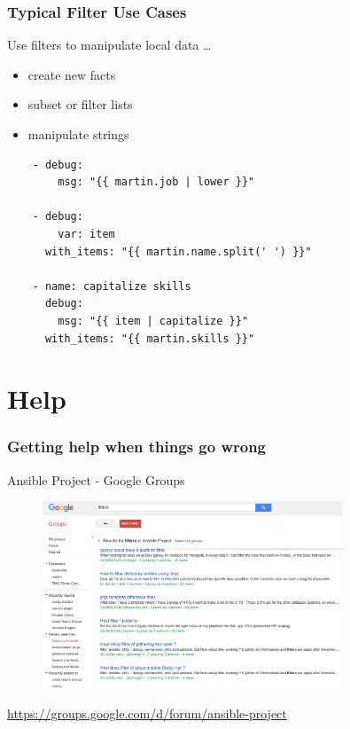 \documentclass[pdf]{beamer}
\begin{document}
\begin{frame}[t,fragile]
  \frametitle{Typical Filter Use Cases}
  Use filters to manipulate local data \ldots
  \begin{itemize}
    \item {create new facts}
    \item {subset or filter lists}
    \item \alert {manipulate strings}
  \end{itemize}
  \begin{lstlisting}
    - debug:
        msg: "{{ martin.job | lower }}"

    - debug:
        var: item
      with_items: "{{ martin.name.split(' ') }}"

    - name: capitalize skills
      debug:
        msg: "{{ item | capitalize }}"
      with_items: "{{ martin.skills }}"
  \end{lstlisting}
\end{frame}

\section{Help}


\begin{frame}[fragile]
  \frametitle{Getting help when things go wrong}
  Ansible Project - Google Groups
  \begin{center}
    \begin{figure}
      \includegraphics[width=0.8\textwidth]{ansible-google-group.png}
    \end{figure}
  \end{center}
  \tiny \url{https://groups.google.com/d/forum/ansible-project}
\end{frame}
\end{document}

